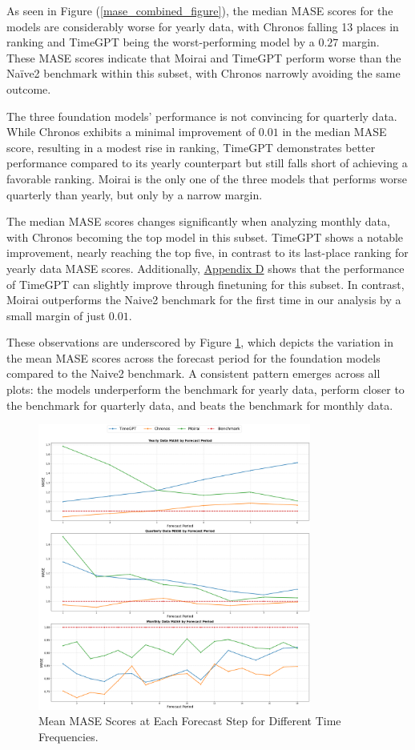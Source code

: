 \documentclass[12pt,a4paper]{article}
\begin{document}
As seen in Figure (\ref{mase_combined_figure}), the median MASE scores for the models are considerably worse for yearly data, with Chronos falling 13 places in ranking and TimeGPT being the worst-performing model by a $0.27$ margin. These MASE scores indicate that Moirai and TimeGPT perform worse than the Naïve2 benchmark within this subset, with Chronos narrowly avoiding the same outcome.

The three foundation models' performance is not convincing for quarterly data. While Chronos exhibits a minimal improvement of $0.01$ in the median MASE score, resulting in a modest rise in ranking, TimeGPT demonstrates better performance compared to its yearly counterpart but still falls short of achieving a favorable ranking. Moirai is the only one of the three models that performs worse quarterly than yearly, but only by a narrow margin. 


The median MASE scores changes significantly when analyzing monthly data, with Chronos becoming the top model in this subset. TimeGPT shows a notable improvement, nearly reaching the top five, in contrast to its last-place ranking for yearly data MASE scores. Additionally, \hyperref[appendix_d]{Appendix D} shows that the performance of TimeGPT can slightly improve through finetuning for this subset. In contrast, Moirai outperforms the Naive2 benchmark for the first time in our analysis by a small margin of just $0.01$. 

These observations are underscored by Figure \ref{mase_rmse_timefrequencies}, which depicts the variation in the mean MASE scores across the forecast period for the foundation models compared to the Naive2 benchmark. A consistent pattern emerges across all plots: the models underperform the benchmark for yearly data, perform closer to the benchmark for quarterly data, and beats the benchmark for monthly data.

\begin{figure}[htbp]
  \centering
  \includegraphics[width=0.8\textwidth]{mase_forecast_period_real.png}
  \caption{Mean MASE Scores at Each Forecast Step for Different Time Frequencies.}
  \label{mase_rmse_timefrequencies}
\end{figure}
\end{document}
